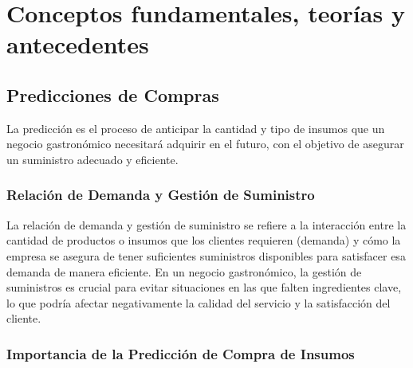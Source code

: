 \fancyhead{}
\fancyfoot{}
\newtheorem{teorema}{Teorema}
\cfoot{\thepage}


\chapter{Conceptos fundamentales, teorías y antecedentes}

\section{Predicciones de Compras}
La predicción es el proceso de anticipar la cantidad y tipo de insumos que un negocio gastronómico necesitará adquirir en el futuro, con el objetivo de asegurar un suministro adecuado y eficiente.


\subsection{Relación de Demanda y Gestión de Suministro}

La relación de demanda y gestión de suministro se refiere a la interacción entre la cantidad de productos o insumos que los clientes requieren (demanda) y cómo la empresa se asegura de tener suficientes suministros disponibles para satisfacer esa demanda de manera eficiente. En un negocio gastronómico, la gestión de suministros es crucial para evitar situaciones en las que falten ingredientes clave, lo que podría afectar negativamente la calidad del servicio y la satisfacción del cliente.


\subsection{Importancia de la Predicción de Compra de Insumos}

